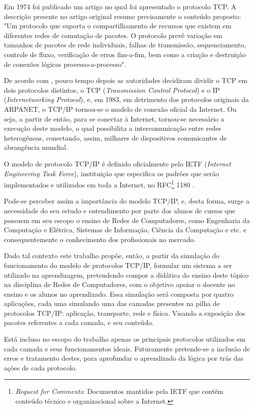 Em 1974 foi publicado um artigo \cite{Cerf} no qual foi apresentado o protocolo TCP. A descrição presente no artigo original resume precisamente o conteúdo proposto: "Um protocolo que suporta o compartilhamento de recursos que existem em diferentes redes de comutação de pacotes. O protocolo prevê variação em tamanhos de pacotes de rede individuais, falhas de transmissão, sequenciamento, controle de fluxo, verificação de erros fim-a-fim, bem como a criação e destruição de conexões lógicas processo-a-processo".

De acordo com , pouco tempo depois as autoridades decidiram dividir o TCP em dois protocolos distintos, o TCP (\textit{Transmission Control Protocol}) e o IP (\textit{Internetworking Protocol}), e, em 1983, em detrimento dos protocolos originais da ARPANET, o TCP/IP tornou-se o modelo de conexão oficial da Internet. Ou seja, a partir de então, para se conectar à Internet, tornou-se necessário a execução deste modelo, o qual possibilita a intercomunicação entre redes heterogêneas, conectando, assim, milhares de dispositivos comunicantes de abrangência mundial.

O modelo de protocolo TCP/IP é definido oficialmente pelo IETF (\textit{Internet Engineering Task Force}), instituição que especifica os padrões que serão implementados e utilizados em toda a Internet, no RFC\footnote{\textit{Request for Comments}: Documentos mantidos pela IETF que contêm conteúdo técnico e organizacional sobre a Internet.} 1180 \cite{RFC1180}.

Pode-se perceber assim a importância do modelo TCP/IP, e, desta forma, surge a necessidade do seu estudo e entendimento por parte dos alunos de cursos que possuem em seu escopo o ensino de Redes de Computadores, como Engenharia da Computação e Elétrica, Sistemas de Informação, Ciência da Computação e etc. e consequentemente o conhecimento dos profissionais no mercado.

Dado tal contexto este trabalho propõe, então, a partir da simulação do funcionamento do modelo de protocolos TCP/IP, formular um sistema a ser utilizado na aprendizagem, pretendendo compor a didática do ensino deste t\'opico na disciplina de Redes de Computadores, com o objetivo apoiar o docente no ensino e os alunos no aprendizado. Essa simulação será composta por quatro aplicações, cada uma simulando uma das camadas presentes na pilha de protocolos TCP/IP: aplicação, transporte, rede e física. Visando a exposição dos pacotes referentes a cada camada, e seu conteúdo. 

Está incluso no escopo do trabalho apenas os principais protocolos utilizados em cada camada e seus funcionamentos ideais. Futuramente pretende-se a inclusão de erros e tratamento destes, para aprofundar o aprendizado da lógica por trás das ações de cada protocolo. 
